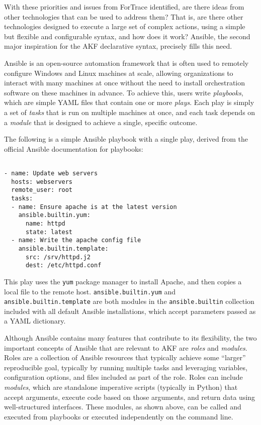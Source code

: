 \documentclass[letterpaper,12pt]{report}
\newcommand{\passthrough}[1]{#1}
\begin{document}
With these priorities and issues from ForTrace identified, are there
ideas from other technologies that can be used to address them? That is,
are there other technologies designed to execute a large set of complex
actions, using a simple but flexible and configurable syntax, and how
does it work? Ansible, the second major inspiration for the AKF
declarative syntax, precisely fills this need.

Ansible is an open-source automation framework that is often used to
remotely configure Windows and Linux machines at scale, allowing
organizations to interact with many machines at once without the need to
install orchestration software on these machines in advance. To achieve
this, users write \emph{playbooks}, which are simple YAML files that
contain one or more \emph{plays}. Each play is simply a set of
\emph{tasks} that is run on multiple machines at once, and each task
depends on a \emph{module} that is designed to achieve a single,
specific outcome.

The following is a simple Ansible playbook with a single play, derived
from the official Ansible documentation for playbooks:

\begin{lstlisting}

- name: Update web servers
  hosts: webservers
  remote_user: root
  tasks:
  - name: Ensure apache is at the latest version
    ansible.builtin.yum:
      name: httpd
      state: latest
  - name: Write the apache config file
    ansible.builtin.template:
      src: /srv/httpd.j2
      dest: /etc/httpd.conf
\end{lstlisting}

This play uses the \passthrough{\lstinline!yum!} package manager to
install Apache, and then copies a local file to the remote host.
\passthrough{\lstinline!ansible.builtin.yum!} and
\passthrough{\lstinline!ansible.builtin.template!} are both modules in
the \passthrough{\lstinline!ansible.builtin!} collection included with
all default Ansible installations, which accept parameters passed as a
YAML dictionary.

Although Ansible contains many features that contribute to its
flexibility, the two important concepts of Ansible that are relevant to
AKF are \emph{roles} and \emph{modules}. Roles are a collection of
Ansible resources that typically achieve some ``larger'' reproducible
goal, typically by running multiple tasks and leveraging variables,
configuration options, and files included as part of the role. Roles can
include \emph{modules}, which are standalone imperative scripts
(typically in Python) that accept arguments, execute code based on those
arguments, and return data using well-structured interfaces. These
modules, as shown above, can be called and executed from playbooks or
executed independently on the command line.
\end{document}
